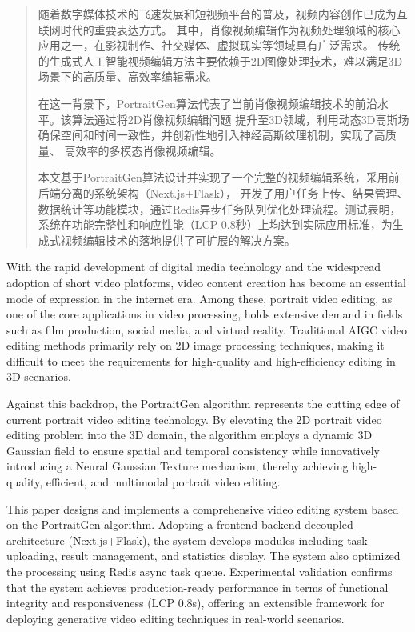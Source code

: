 

\begin{abstract}
  随着数字媒体技术的飞速发展和短视频平台的普及，视频内容创作已成为互联网时代的重要表达方式。
  其中，肖像视频编辑作为视频处理领域的核心应用之一，在影视制作、社交媒体、虚拟现实等领域具有广泛需求。
  传统的生成式人工智能视频编辑方法主要依赖于2D图像处理技术，难以满足3D场景下的高质量、高效率编辑需求。

  在这一背景下，PortraitGen算法代表了当前肖像视频编辑技术的前沿水平。该算法通过将2D肖像视频编辑问题
  提升至3D领域，利用动态3D高斯场确保空间和时间一致性，并创新性地引入神经高斯纹理机制，实现了高质量、
  高效率的多模态肖像视频编辑。
  
  本文基于PortraitGen算法设计并实现了一个完整的视频编辑系统，采用前后端分离的系统架构（Next.js+Flask），
  开发了用户任务上传、结果管理、数据统计等功能模块，通过Redis异步任务队列优化处理流程。测试表明，
  系统在功能完整性和响应性能（LCP 0.8秒）上均达到实际应用标准，为生成式视频编辑技术的落地提供了可扩展的解决方案。

\end{abstract}

\begin{abstract*}
  With the rapid development of digital media technology and the widespread adoption of short 
  video platforms, video content creation has become an essential mode of expression in the 
  internet era. Among these, portrait video editing, as one of the core applications in video 
  processing, holds extensive demand in fields such as film production, social media, and virtual 
  reality. Traditional AIGC video editing methods primarily rely on 2D image 
  processing techniques, making it difficult to meet the requirements for high-quality and 
  high-efficiency editing in 3D scenarios.

  Against this backdrop, the PortraitGen algorithm represents the cutting edge of current portrait 
  video editing technology. By elevating the 2D portrait video editing problem into the 3D domain, 
  the algorithm employs a dynamic 3D Gaussian field to ensure spatial and temporal consistency while 
  innovatively introducing a Neural Gaussian Texture mechanism, thereby achieving high-quality, 
  efficient, and multimodal portrait video editing.

  This paper designs and implements a comprehensive video editing system based on the PortraitGen 
  algorithm. Adopting a frontend-backend decoupled architecture (Next.js+Flask), the system develops 
  modules including task uploading, result management, and statistics display. The system also 
  optimized the processing using Redis async task queue. Experimental validation confirms that 
  the system achieves production-ready performance in terms of functional integrity and 
  responsiveness (LCP 0.8s), offering an extensible framework for deploying generative video 
  editing techniques in real-world scenarios.
\end{abstract*}
